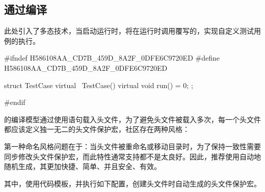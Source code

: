 \begin{content}
\begin{story}
\begin{content}
\end{content}

\end{story}

\subsection{通过编译}

此处引入了多态技术，当启动运行时，将在运行时调用覆写的，实现自定义测试用例的执行。

\begin{leftbar}
 \begin{c++}[caption={\ttfamily{include/mars/core/TestCase.h}}]
#ifndef H586108AA_CD7B_459D_8A2F_0DFE6C9720ED
#define H586108AA_CD7B_459D_8A2F_0DFE6C9720ED

struct TestCase {
  virtual ~TestCase() {}
  virtual void run() = 0;
};

#endif
  \end{c++}
\end{leftbar}

\begin{story}
  \begin{center}
  \end{center}

\begin{content}

的编译模型通过使用语句载入头文件，为了避免头文件被载入多次，每一个头文件都应该定义独一无二的头文件保护宏，社区存在两种风格：

\begin{enum}
\end{enum}

第一种命名风格问题在于：当头文件被重命名或移动目录时，为了保持一致性需要同步修改头文件保护宏，而此特性通常支持都不是太良好。因此，推荐使用自动地随机生成，其更加快捷、简单、并且安全、有效。

其中，使用代码模板，并执行如下配置，创建头文件时自动生成的头文件保护宏。

\begin{leftbar}
\end{leftbar}


\end{content}
\end{story}
\end{content}
